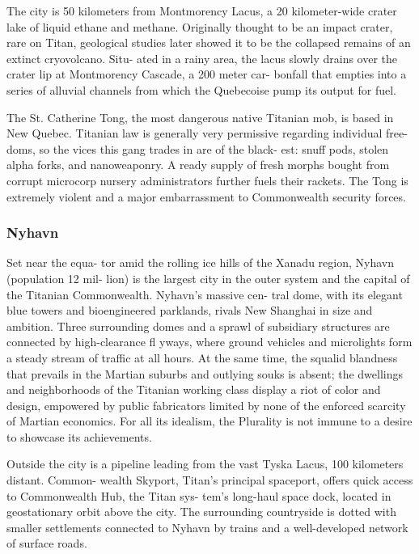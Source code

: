 The city is 50 kilometers from Montmorency Lacus, 
a 20 kilometer-wide crater lake of liquid ethane and 
methane. Originally thought to be an impact crater, 
rare on Titan, geological studies later showed it to be 
the collapsed remains of an extinct cryovolcano. Situ-
ated in a rainy area, the lacus slowly drains over the 
crater lip at Montmorency Cascade, a 200 meter car-
bonfall that empties into a series of alluvial channels 
from which the Quebecoise pump its output for fuel.

The St. Catherine Tong, the most dangerous native 
Titanian mob, is based in New Quebec. Titanian law 
is generally very permissive regarding individual free-
doms, so the vices this gang trades in are of the black-
est: snuff pods, stolen alpha forks, and nanoweaponry. 
A ready supply of fresh morphs bought from corrupt 
microcorp nursery administrators further fuels their 
rackets. The Tong is extremely violent and a major 
embarrassment to Commonwealth security forces.

\subsubsection{Nyhavn}

Set near the equa-
tor amid the rolling ice 
hills of the Xanadu region, 
Nyhavn (population 12 mil-
lion) is the largest city in the outer 
system and the capital of the Titanian 
Commonwealth. Nyhavn's massive cen-
tral dome, with its elegant blue towers and 
bioengineered parklands, rivals New Shanghai 
in size and ambition. Three surrounding domes 
and a sprawl of subsidiary structures are connected 
by high-clearance fl yways, where ground vehicles 
and microlights form a steady stream of traffic at all 
hours. At the same time, the squalid blandness that 
prevails in the Martian suburbs and outlying souks 
is absent; the dwellings and neighborhoods of the 
Titanian working class display a riot of color and 
design, empowered by public fabricators limited by 
none of the enforced scarcity of Martian economics. 
For all its idealism, the Plurality is not immune to a 
desire to showcase its achievements.

Outside the city is a pipeline leading from the 
vast Tyska Lacus, 100 kilometers distant. Common-
wealth Skyport, Titan's principal spaceport, offers 
quick access to Commonwealth Hub, the Titan sys-
tem's long-haul space dock, located in geostationary 
orbit above the city. The surrounding countryside 
is dotted with smaller settlements connected to 
Nyhavn by trains and a well-developed network of 
surface roads.

